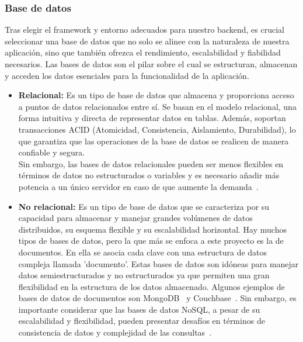 \subsubsection{Base de datos}
Tras elegir el framework y entorno adecuados para nuestro backend, es crucial seleccionar una base de datos que no solo se alinee con la naturaleza de nuestra aplicación, sino que también ofrezca el rendimiento, escalabilidad y fiabilidad necesarios. Las bases de datos son el pilar sobre el cual se estructuran, almacenan y acceden los datos esenciales para la funcionalidad de la aplicación.
\begin{itemize}
	\item \textbf{Relacional:} Es un tipo de base de datos que almacena y proporciona acceso a puntos de datos relacionados entre sí. Se basan en el modelo relacional, una forma intuitiva y directa de representar datos en tablas. Además, soportan transacciones ACID (Atomicidad, Consistencia, Aislamiento, Durabilidad), lo que garantiza que las operaciones de la base de datos se realicen de manera confiable y segura.\\
	      Sin embargo, las bases de datos relacionales pueden ser menos flexibles en términos de datos no estructurados o variables y es necesario añadir más potencia a un único servidor en caso de que aumente la demanda~\cite{sql}.
	\item \textbf{No relacional:} Es un tipo de base de datos que se caracteriza por su capacidad para almacenar y manejar grandes volúmenes de datos distribuidos, su esquema flexible y su escalabilidad horizontal. Hay muchos tipos de bases de datos, pero la que más se enfoca a este proyecto es la de documentos. En ella se asocia cada clave con una estructura de datos compleja llamada 'documento'. Estas bases de datos son idóneas para manejar datos semiestructurados y no estructurados ya que permiten una gran flexibilidad en la estructura de los datos almacenado. Algunos ejemplos de bases de datos de documentos son MongoDB~\cite{mongodb} y Couchbase~\cite{couchbase}.
	      Sin embargo, es importante considerar que las bases de datos NoSQL, a pesar de su escalabilidad y flexibilidad, pueden presentar desafíos en términos de consistencia de datos y complejidad de las consultas~\cite{nosql}.
\end{itemize}
